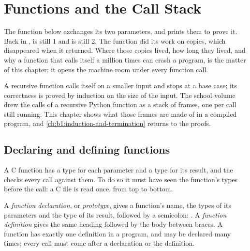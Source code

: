 \chapter{Functions and the Call Stack}\label{ch:b1:c-functions-and-stack}

The function  below exchanges its two parameters, and prints them to prove it. Back in ,
 is still 1 and  is still 2. The function did its work on copies, which disappeared when it
returned. Where those copies lived, how long they lived, and why a function that calls itself a million times can
crash a program, is the matter of this chapter: it opens the machine room under every function call.

\label{lst:b1:c-functions-and-stack:swap}

\label{out:b1:c-functions-and-stack:swap}

\begin{recall}
A recursive function calls itself on a smaller input and stops at a base case; its correctness is proved by
induction on the size of the input. The school volume drew the calls of a recursive Python function as a stack of
frames, one per call still running. This chapter shows what those frames are made of in a compiled program, and
\cref{ch:b1:induction-and-termination} returns to the proofs.
\end{recall}

\section{Declaring and defining functions}\label{sec:b1:c-functions-and-stack:declaring}

A C function has a type for each parameter and a type for its result, and the  checks every call against
them. To do so it must have seen the function's types before the call: a C file is read once, from top to bottom.

\begin{definition}\label{def:b1:c-functions-and-stack:declaration}
A \emph{function declaration}, or \emph{prototype}, gives a function's
name, the types of its parameters and the type of its result, followed by a semicolon:
. A \emph{function definition} gives the same heading
followed by the body between braces. A function has exactly one definition in a program, and may be declared many
times; every call must come after a declaration or the definition.
\end{definition}

